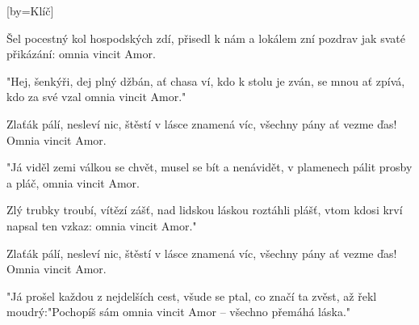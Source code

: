 [by={Klíč}]

\beginverse*{}
             
\endverse{}

\beginverse{}
Šel pocestný kol hospodských zdí,
přisedl k nám a lokálem zní
pozdrav jak svaté přikázání:
omnia vincit Amor.
\endverse{}

\beginverse{}
"Hej, šenkýři, dej plný džbán,
ať chasa ví, kdo k stolu je zván,
se mnou ať zpívá, kdo za své vzal
omnia vincit Amor."
\endverse{}

\beginchorus{}
Zlaťák pálí, nesleví nic,
štěstí v lásce znamená víc,
všechny pány ať vezme ďas! 
Omnia vincit Amor.
\endchorus{}

\beginverse{}
"Já viděl zemi válkou se chvět,
musel se bít a nenávidět,
v plamenech pálit prosby a pláč,
omnia vincit Amor.
\endverse{}

\beginverse{}
Zlý trubky troubí, vítězí zášť,
nad lidskou láskou roztáhli plášť,
vtom kdosi krví napsal ten vzkaz:
omnia vincit Amor."
\endverse{}

\repeatingchorus{}
\beginchorus{}
Zlaťák pálí, nesleví nic,
štěstí v lásce znamená víc,
všechny pány ať vezme ďas! 
Omnia vincit Amor.
\endchorus{}

\beginverse{}
"Já prošel každou z nejdelších cest,
všude se ptal, co značí ta zvěst,
až řekl moudrý:"Pochopíš sám
omnia vincit Amor -- všechno přemáhá láska."
\endverse{}

